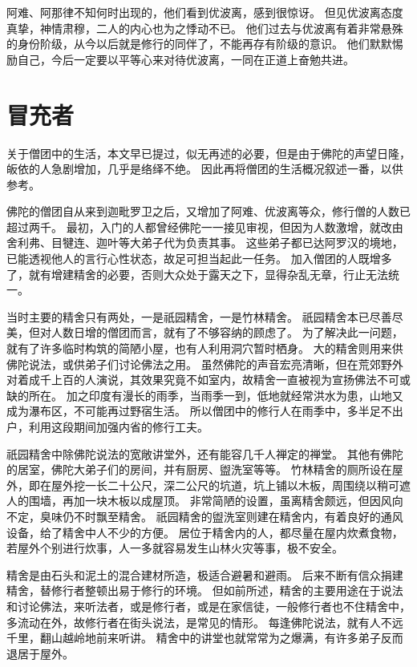 \documentclass[twoside,openany]{book}
\begin{document}
阿难、阿那律不知何时出现的，他们看到优波离，感到很惊讶。
但见优波离态度真挚，神情肃穆，二人的内心也为之悸动不已。
他们过去与优波离有着非常悬殊的身份阶级，从今以后就是修行的同伴了，不能再存有阶级的意识。
他们默默惕励自己，今后一定要以平等心来对待优波离，一同在正道上奋勉共进。

\section{冒充者}\label{sec9.4}

关于僧团中的生活，本文早已提过，似无再述的必要，但是由于佛陀的声望日隆，皈依的人急剧增加，几乎是络绎不绝。
因此再将僧团的生活概况叙述一番，以供参考。

佛陀的僧团自从来到迦毗罗卫之后，又增加了阿难、优波离等众，修行僧的人数已超过两千。
最初，入门的人都曾经佛陀一一接见审视，但因为人数激增，就改由舍利弗、目犍连、迦叶等大弟子代为负责其事。
这些弟子都已达阿罗汉的境地，已能透视他人的言行心性状态，故足可担当起此一任务。
加入僧团的人既增多了，就有增建精舍的必要，否则大众处于露天之下，显得杂乱无章，行止无法统一。

当时主要的精舍只有两处，一是祇园精舍，一是竹林精舍。
祇园精舍本已尽善尽美，但对人数日增的僧团而言，就有了不够容纳的顾虑了。
为了解决此一问题，就有了许多临时构筑的简陋小屋，也有人利用洞穴暂时栖身。
大的精舍则用来供佛陀说法，或供弟子们讨论佛法之用。
虽然佛陀的声音宏亮清晰，但在荒郊野外对着成千上百的人演说，其效果究竟不如室内，故精舍一直被视为宣扬佛法不可或缺的所在。
加之印度有漫长的雨季，当雨季一到，低地就经常洪水为患，山地又成为瀑布区，不可能再过野宿生活。
所以僧团中的修行人在雨季中，多半足不出户，利用这段期间加强内省的修行工夫。

祇园精舍中除佛陀说法的宽敞讲堂外，还有能容几千人禅定的禅堂。
其他有佛陀的居室，佛陀大弟子们的房间，并有厨房、盥洗室等等。
竹林精舍的厕所设在屋外，即在屋外挖一长二十公尺，深二公尺的坑道，坑上铺以木板，周围绕以稍可遮人的围墙，再加一块木板以成屋顶。
非常简陋的设置，虽离精舍颇远，但因风向不定，臭味仍不时飘至精舍。
祇园精舍的盥洗室则建在精舍内，有着良好的通风设备，给了精舍中人不少的方便。
居位于精舍内的人，都尽量在屋内炊煮食物，若屋外个别进行炊事，人一多就容易发生山林火灾等事，极不安全。

精舍是由石头和泥土的混合建材所造，极适合避暑和避雨。
后来不断有信众捐建精舍，替修行者整顿出易于修行的环境。
但如前所述，精舍的主要用途在于说法和讨论佛法，来听法者，或是修行者，或是在家信徒，一般修行者也不住精舍中，多流动在外，故修行者在街头说法，是常见的情形。
每逢佛陀说法，就有人不远千里，翻山越岭地前来听讲。
精舍中的讲堂也就常常为之爆满，有许多弟子反而退居于屋外。
\end{document}
